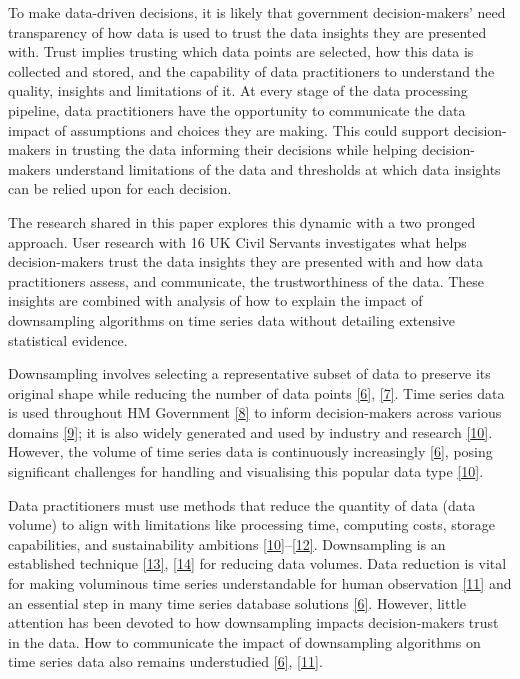 \documentclass{article}
\begin{document}
To make data-driven decisions, it is likely that government
decision-makers' need transparency of how data is used to trust the data
insights they are presented with. Trust implies trusting which data
points are selected, how this data is collected and stored, and the
capability of data practitioners to understand the quality, insights and
limitations of it. At every stage of the data processing pipeline, data
practitioners have the opportunity to communicate the data impact of
assumptions and choices they are making. This could support
decision-makers in trusting the data informing their decisions while
helping decision-makers understand limitations of the data and
thresholds at which data insights can be relied upon for each decision.

The research shared in this paper explores this dynamic with a two
pronged approach. User research with 16 UK Civil Servants investigates
what helps decision-makers trust the data insights they are presented
with and how data practitioners assess, and communicate, the
trustworthiness of the data. These insights are combined with analysis
of how to explain the impact of downsampling algorithms on time series
data without detailing extensive statistical evidence.

Downsampling involves selecting a representative subset of data to
preserve its original shape while reducing the number of data points
\protect\hyperlink{ref-datapoint}{{[}6{]}},
\protect\hyperlink{ref-MinMaxLTTB}{{[}7{]}}. Time series data is used
throughout HM Government \protect\hyperlink{ref-pathway}{{[}8{]}} to
inform decision-makers across various domains
\protect\hyperlink{ref-onstool}{{[}9{]}}; it is also widely generated
and used by industry and research
\protect\hyperlink{ref-TVStore}{{[}10{]}}. However, the volume of time
series data is continuously increasingly
\protect\hyperlink{ref-datapoint}{{[}6{]}}, posing significant
challenges for handling and visualising this popular data type
\protect\hyperlink{ref-TVStore}{{[}10{]}}.

Data practitioners must use methods that reduce the quantity of data
(data volume) to align with limitations like processing time, computing
costs, storage capabilities, and sustainability ambitions
\protect\hyperlink{ref-TVStore}{{[}10{]}}--\protect\hyperlink{ref-Shift}{{[}12{]}}.
Downsampling is an established technique
\protect\hyperlink{ref-downsampling}{{[}13{]}},
\protect\hyperlink{ref-sampling}{{[}14{]}} for reducing data volumes.
Data reduction is vital for making voluminous time series understandable
for human observation \protect\hyperlink{ref-Sveinn}{{[}11{]}} and an
essential step in many time series database solutions
\protect\hyperlink{ref-datapoint}{{[}6{]}}. However, little attention
has been devoted to how downsampling impacts decision-makers trust in
the data. How to communicate the impact of downsampling algorithms on
time series data also remains understudied
\protect\hyperlink{ref-datapoint}{{[}6{]}},
\protect\hyperlink{ref-Sveinn}{{[}11{]}}.
\end{document}
